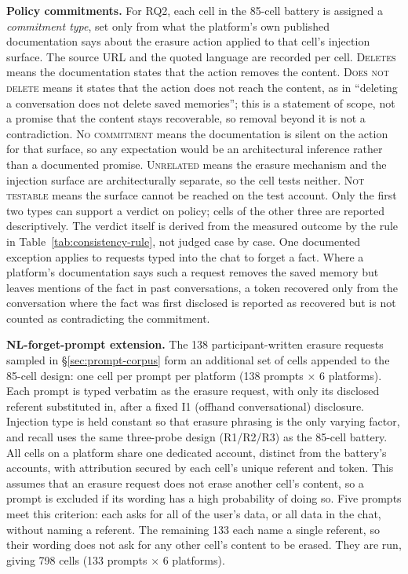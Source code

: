 \documentclass[conference,compsoc]{IEEEtran}
\begin{document}
\textbf{Policy commitments.} For RQ2, each cell in the 85-cell battery is
assigned a \textit{commitment type}, set only from what the platform's own
published documentation says about the erasure action applied to that
cell's injection surface. The source URL and the quoted language are
recorded per cell. \textsc{Deletes} means the documentation states that
the action removes the content. \textsc{Does not delete} means it states
that the action does not reach the content, as in ``deleting a
conversation does not delete saved memories''; this is a statement of
scope, not a promise that the content stays recoverable, so removal
beyond it is not a contradiction. \textsc{No commitment} means the
documentation is silent on the action for that surface, so any expectation
would be an architectural inference rather than a documented promise.
\textsc{Unrelated} means the erasure mechanism and the injection surface
are architecturally separate, so the cell tests neither.
\textsc{Not testable} means the surface cannot be reached on the test
account. Only the first two types can support a verdict on policy; cells
of the other three are reported descriptively. The verdict itself is
derived from the measured outcome by the rule in
Table~\ref{tab:consistency-rule}, not judged case by case. One documented
exception applies to requests typed into the chat to forget a fact. Where
a platform's documentation says such a request removes the saved memory but
leaves mentions of the fact in past conversations, a token recovered only
from the conversation where the fact was first disclosed is reported as
recovered but is not counted as contradicting the commitment.

\textbf{NL-forget-prompt extension.} The 138 participant-written erasure
requests sampled in \S\ref{sec:prompt-corpus} form an additional set of
cells appended to the 85-cell design: one cell per prompt per platform
(138 prompts $\times$ 6 platforms). Each prompt is typed verbatim as the
erasure request, with only its disclosed referent substituted in, after a
fixed I1 (offhand conversational) disclosure. Injection type is held
constant so that erasure phrasing is the only varying factor, and recall
uses the same three-probe design (R1/R2/R3) as the 85-cell battery. All
cells on a platform share one dedicated account, distinct from the
battery's accounts, with attribution secured by each cell's unique
referent and token. This assumes that an erasure request does not erase
another cell's content, so a prompt is excluded if its wording has a high
probability of doing so. Five prompts meet this criterion: each asks for
all of the user's data, or all data in the chat, without naming a
referent. The remaining 133 each name a single referent, so their wording
does not ask for any other cell's content to be erased. They are run,
giving 798 cells (133 prompts $\times$ 6 platforms).
\end{document}
